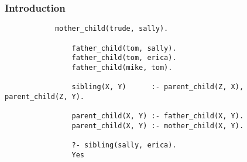 \begin{frame}[fragile]
    \frametitle{Introduction}
    \begin{minipage}{\textwidth}
        \begin{lstlisting}
            mother_child(trude, sally).
                
                father_child(tom, sally).
                father_child(tom, erica).
                father_child(mike, tom).
                
                sibling(X, Y)      :- parent_child(Z, X), parent_child(Z, Y).
                
                parent_child(X, Y) :- father_child(X, Y).
                parent_child(X, Y) :- mother_child(X, Y).

                ?- sibling(sally, erica).
                Yes    
        \end{lstlisting}
    \end{minipage}
\end{frame}
